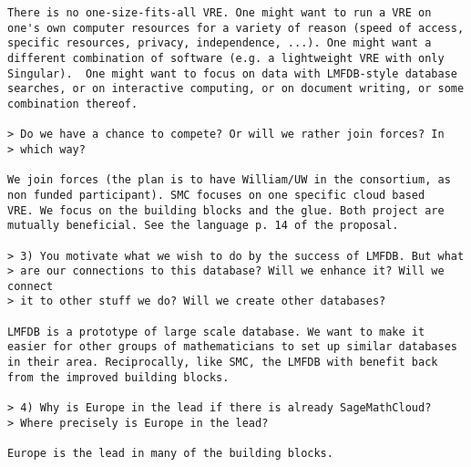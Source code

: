 \begin{draft}
\begin{verbatim}
There is no one-size-fits-all VRE. One might want to run a VRE on
one's own computer resources for a variety of reason (speed of access,
specific resources, privacy, independence, ...). One might want a
different combination of software (e.g. a lightweight VRE with only
Singular).  One might want to focus on data with LMFDB-style database
searches, or on interactive computing, or on document writing, or some
combination thereof.

> Do we have a chance to compete? Or will we rather join forces? In
> which way?

We join forces (the plan is to have William/UW in the consortium, as
non funded participant). SMC focuses on one specific cloud based
VRE. We focus on the building blocks and the glue. Both project are
mutually beneficial. See the language p. 14 of the proposal.

> 3) You motivate what we wish to do by the success of LMFDB. But what
> are our connections to this database? Will we enhance it? Will we connect
> it to other stuff we do? Will we create other databases?

LMFDB is a prototype of large scale database. We want to make it
easier for other groups of mathematicians to set up similar databases
in their area. Reciprocally, like SMC, the LMFDB with benefit back
from the improved building blocks.

> 4) Why is Europe in the lead if there is already SageMathCloud?
> Where precisely is Europe in the lead?

Europe is the lead in many of the building blocks.
\end{verbatim}





\end{draft}
